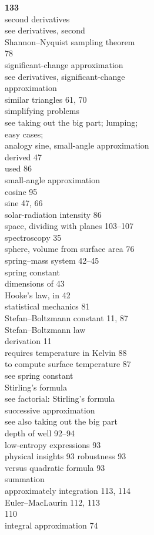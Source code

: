 \documentclass[a4paper,fleqn]{article}
\title{}
\date{}
\begin{document}
\begin{multicols}{2}
\large{}\hfill\textbf{133}\\
second derivatives\\
see derivatives, second\\
Shannon–Nyquist sampling theorem\\
78\\
significant-change approximation\\
see derivatives, significant-change\\
approximation \\
similar triangles 61, 70\\
simplifying problems\\
see taking out the big part; lumping;\\
easy cases;\\
analogy sine, small-angle approximation\\
derived 47 \\
used 86\\
small-angle approximation\\ 
cosine 95\\ 
sine 47, 66\\
solar-radiation intensity 86\\
space, dividing with planes 103–107 \\
spectroscopy 35\\ 
sphere, volume from surface area 76\\
spring–mass system 42–45\\
spring constant \\
dimensions of 43\\
Hooke’s law, in 42 \\
statistical mechanics 81\\
Stefan–Boltzmann constant 11, 87\\
Stefan–Boltzmann law\\
derivation 11\\
requires temperature in Kelvin 88 \\
to compute surface temperature 87\\
see spring constant\\
Stirling’s formula \\
see factorial: Stirling’s formula\\
successive approximation \\
see also taking out the big part \\
depth of well 92–94 \\
low-entropy expressions 93\\
physical insights 93 robustness 93\\
versus quadratic formula 93\\
summation\\
approximately integration 113, 114\\
Euler–MacLaurin 112, 113\\
110\\
integral approximation 74\\\\\\


\end{multicols}
\end{document}
